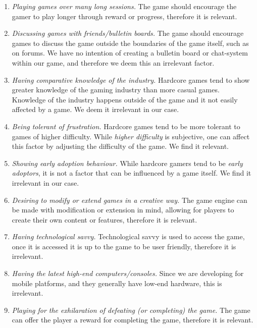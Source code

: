 \begin{enumerate}
\item \emph{Playing games over many long sessions.}
The game should encourage the gamer to play longer through reward or progress, therefore it is relevant.

\item \emph{Discussing games with friends/bulletin boards.}
The game should encourage games to discuss the game outside the boundaries of the game itself, such as on forums.
We have no intention of creating a bulletin board or chat-system within our game, and therefore we deem this an irrelevant factor.

\item \emph{Having comparative knowledge of the industry.}
Hardcore games tend to show greater knowledge of the gaming industry than more casual games.
Knowledge of the industry happens outside of the game and it not easily affected by a game. We deem it irrelevant in our case.

\item \emph{Being tolerant of frustration.}
Hardcore games tend to be more tolerant to games of higher difficulty.
While \textit{higher difficulty} is subjective, one can affect this factor by adjusting the difficulty of the game.
We find it relevant.

\item \emph{Showing early adoption behaviour.}
While hardcore gamers tend to be \textit{early adoptors}, it is not a factor that can be influenced by a game itself.
We find it irrelevant in our case.

\item \emph{Desiring to modify or extend games in a creative way.}
The game engine can be made with modification or extension in mind, allowing for players to create their own content or features, therefore it is relevant.

\item \emph{Having technological savvy.}
Technological savvy is used to access the game, once it is accessed it is up to the game to be user friendly, therefore it is irrelevant.

\item \emph{Having the latest high-end computers/consoles.}
Since we are developing for mobile platforms, and they generally have low-end hardware, this is irrelevant.

\item \emph{Playing for the exhilaration of defeating (or completing) the game.}
The game can offer the player a reward for completing the game, therefore it is relevant.


\end{enumerate}
